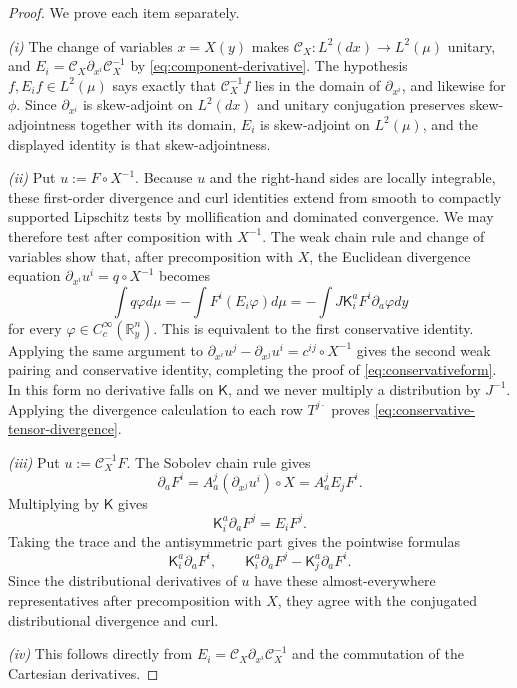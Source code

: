 \documentclass[11pt,reqno]{amsart}
\theoremstyle{plain}
\theoremstyle{definition}
\theoremstyle{remark}
\numberwithin{equation}{section}
\newcommand{\Kmat}{\mathsf K}
\newcommand{\Real}{\mathbb R}
\begin{document}
\begin{proof} We prove each item separately.

\emph{(i)} The change of variables $x=X(y)$ makes
$\mathcal C_X:L^2(dx)\to L^2(\mu)$ unitary, and
$E_i=\mathcal C_X\partial_{x^i}\mathcal C_X^{-1}$ by
\eqref{eq:component-derivative}.  The hypothesis $f,E_if\in L^2(\mu)$ says
exactly that $\mathcal C_X^{-1}f$ lies in the domain of $\partial_{x^i}$, and
likewise for $\phi$.  Since $\partial_{x^i}$ is skew-adjoint on $L^2(dx)$ and
unitary conjugation preserves skew-adjointness together with its domain, $E_i$
is skew-adjoint on $L^2(\mu)$, and the displayed identity is that
skew-adjointness.

\emph{(ii)} Put $u:=F\circ X^{-1}$. Because $u$ and the right-hand sides are
locally integrable, these first-order divergence and curl identities extend
from smooth to compactly supported Lipschitz tests by mollification and
dominated convergence. We may therefore test after composition with $X^{-1}$.
The weak chain rule and change of
variables show that, after precomposition with $X$, the Euclidean divergence equation
$\partial_{x^i}u^i=q\circ X^{-1}$ becomes
\[
 \int q\varphi d\mu
 =-\int F^i(E_i\varphi)d\mu
 =-\int J\Kmat_i^aF^i\partial_a\varphi dy
\]
for every $\varphi\in C_c^\infty(\Real^n_y)$. This is equivalent to the first
conservative identity. Applying the same argument to
$\partial_{x^i}u^j-\partial_{x^j}u^i=c^{ij}\circ X^{-1}$ gives the second weak
pairing and conservative identity, completing the proof of \eqref{eq:conservativeform}. In this form no derivative falls on
$\Kmat$, and we never multiply a distribution by $J^{-1}$.
Applying the divergence calculation to each row $T^{j \cdot}$ proves
\eqref{eq:conservative-tensor-divergence}.

\emph{(iii)} Put $u:=\mathcal C_X^{-1}F$. The Sobolev chain rule gives
\[
 \partial_aF^i
 =A_a^j(\partial_{x^j}u^i)\circ X
 =A_a^jE_jF^i.
\]
Multiplying by $\Kmat$ gives
\[
 \Kmat_i^a\partial_aF^j=E_iF^j.
\]
Taking the trace and the antisymmetric part gives the pointwise formulas
\[
 \Kmat_i^a\partial_aF^i,
 \qquad
 \Kmat_i^a\partial_aF^j-\Kmat_j^a\partial_aF^i.
\]
Since the distributional derivatives of $u$ have these almost-everywhere
representatives after precomposition with $X$, they agree with the conjugated
distributional divergence and curl.

\emph{(iv)} This follows directly from
$E_i=\mathcal C_X\partial_{x^i}\mathcal C_X^{-1}$ and the commutation of the
Cartesian derivatives.
\end{proof}
\end{document}
